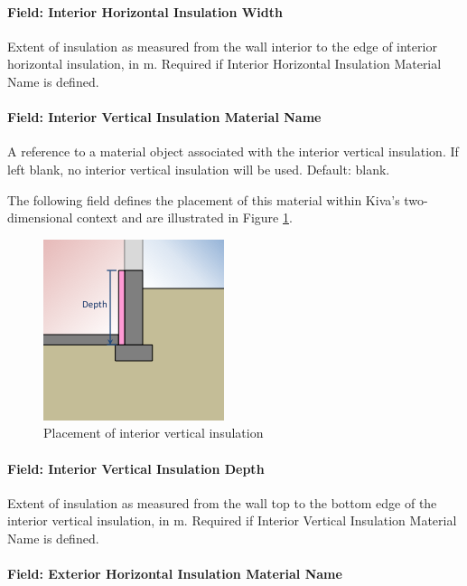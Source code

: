 \paragraph{Field: Interior Horizontal Insulation
Width}

Extent of insulation as measured from the wall interior to the edge of
interior horizontal insulation, in m. Required if Interior Horizontal
Insulation Material Name is defined.

\paragraph{Field: Interior Vertical Insulation Material
Name}

A reference to a material object associated with the interior vertical
insulation. If left blank, no interior vertical insulation will be used.
Default: blank.

The following field defines the placement of this material within Kiva's
two-dimensional context and are illustrated in Figure \ref{fig:ivi}.

\begin{figure}
\centering
\includegraphics{media/kiva-2d-ivi.png}
\caption{Placement of interior vertical insulation\label{fig:ivi}}
\end{figure}

\paragraph{Field: Interior Vertical Insulation
Depth}

Extent of insulation as measured from the wall top to the bottom edge of
the interior vertical insulation, in m. Required if Interior Vertical
Insulation Material Name is defined.

\paragraph{Field: Exterior Horizontal Insulation Material
Name}

